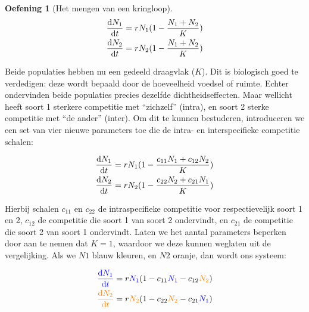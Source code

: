 \documentclass[
  a4paper,
]{scrbook}
\theoremstyle{definition}
\newtheorem{exercise}{Oefening}[chapter]
\theoremstyle{remark}
\begin{document}
\begin{exercise}[Het mengen van een
kringloop]
\begin{align*}
\mathchoice{\frac{\mathrm{d}N_1}
{\mathrm{d}t}}{\mathrm{d}N_1/\mathrm{d}t}
{\mathrm{d}N_1/\mathrm{d}t}
{\mathrm{d}N_1/\mathrm{d}t} &= rN_1(1-\frac{N_1+N_2}{K}) \\
\mathchoice{\frac{\mathrm{d}N_2}
{\mathrm{d}t}}{\mathrm{d}N_2/\mathrm{d}t}
{\mathrm{d}N_2/\mathrm{d}t}
{\mathrm{d}N_2/\mathrm{d}t} &= rN_2(1-\frac{N_1+N_2}{K})
\end{align*}

Beide populaties hebben nu een gedeeld draagvlak (\(K\)). Dit is
biologisch goed te verdedigen: deze wordt bepaald door de hoeveelheid
voedsel of ruimte. Echter ondervinden beide populaties precies dezelfde
dichtheidseffecten. Maar wellicht heeft soort 1 sterkere competitie met
``zichzelf'' (intra), en soort 2 sterke competitie met ``de ander''
(inter). Om dit te kunnen bestuderen, introduceren we een set van vier
nieuwe parameters toe die de intra- en interspecifieke competitie
schalen:

\begin{align*}
\mathchoice{\frac{\mathrm{d}N_1}
{\mathrm{d}t}}{\mathrm{d}N_1/\mathrm{d}t}
{\mathrm{d}N_1/\mathrm{d}t}
{\mathrm{d}N_1/\mathrm{d}t} &= rN_1(1-\frac{c_{11}N_1+c_{12}N_2}{K}) \\
\mathchoice{\frac{\mathrm{d}N_2}
{\mathrm{d}t}}{\mathrm{d}N_2/\mathrm{d}t}
{\mathrm{d}N_2/\mathrm{d}t}
{\mathrm{d}N_2/\mathrm{d}t} &= rN_2(1-\frac{c_{22}N_2+c_{21}N_1}{K})
\end{align*}

Hierbij schalen \(c_{11}\) en \(c_{22}\) de intraspecifieke competitie
voor respectievelijk soort 1 en 2, \(c_{12}\) de competitie die soort 1
van soort 2 ondervindt, en \(c_{21}\) de competitie die soort 2 van
soort 1 ondervindt. Laten we het aantal parameters beperken door aan te
nemen dat \(K=1\), waardoor we deze kunnen weglaten uit de vergelijking.
Als we \(N1\) blauw kleuren, en \(N2\) oranje, dan wordt ons systeem:

\begin{align*}
\color{blue} \mathchoice{\frac{\mathrm{d}N_1}
{\mathrm{d}t}}{\mathrm{d}N_1/\mathrm{d}t}
{\mathrm{d}N_1/\mathrm{d}t}
{\mathrm{d}N_1/\mathrm{d}t} &= r\textcolor{blue}{N_1}(1 - c_{11}\textcolor{blue}{N_1} - c_{12}\textcolor{orange}{N_2})\\
\color{orange}\mathchoice{\frac{\mathrm{d}N_2}
{\mathrm{d}t}}{\mathrm{d}N_2/\mathrm{d}t}
{\mathrm{d}N_2/\mathrm{d}t}
{\mathrm{d}N_2/\mathrm{d}t} &= r\textcolor{orange}{N_2}(1 - c_{22}\textcolor{orange}{N_2} - c_{21}\textcolor{blue}{N_1})
\end{align*}


\end{exercise}
\end{document}
